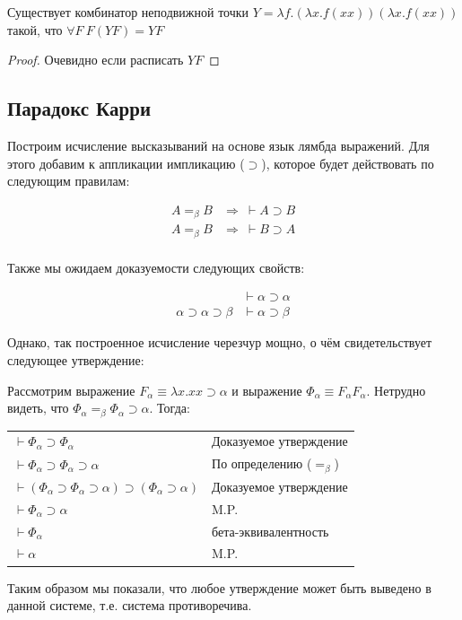 \begin{theorem}
Существует комбинатор неподвижной точки $Y = \lambda f . (\lambda x . f (x x))
(\lambda x . f (x x))$ такой, что $\forall F \  F (Y F) = Y F$
\end{theorem}
\begin{proof}
Очевидно если расписать $Y F$
\end{proof}


\subsection{Парадокс Карри}

Построим исчисление высказываний на основе язык лямбда выражений. Для этого
добавим к аппликации импликацию ($\supset$), которое будет действовать по
следующим правилам:

\begin{align*}
A =_\beta B &\Rightarrow \ \vdash A \supset B \\
A =_\beta B &\Rightarrow \ \vdash B \supset A \\
\end{align*}

Также мы ожидаем доказуемости следующих свойств:

\begin{align*}
&\vdash \alpha \supset \alpha \\
\alpha \supset \alpha \supset \beta &\vdash \alpha \supset \beta
\end{align*}

Однако, так построенное исчисление черезчур мощно, о чём свидетельствует
следующее утверждение:

Рассмотрим выражение $F_\alpha \equiv \lambda x. x x \supset \alpha$
и выражение $\Phi_\alpha \equiv F_\alpha F_\alpha$.
Нетрудно видеть, что $\Phi_\alpha =_\beta \Phi_\alpha \supset \alpha$.
Тогда: \\

\begin{tabular}{ll}
$\vdash \Phi_\alpha \supset \Phi_\alpha$ & Доказуемое утверждение\\
$\vdash \Phi_\alpha \supset \Phi_\alpha \supset \alpha$ & По определению ($=_\beta$)\\
$\vdash (\Phi_\alpha \supset \Phi_\alpha \supset \alpha) \supset (\Phi_\alpha \supset \alpha)$ & Доказуемое утверждение\\
$\vdash \Phi_\alpha \supset \alpha$ & M.P.\\
$\vdash \Phi_\alpha$ & бета-эквивалентность\\
$\vdash \alpha$ & M.P.
\end{tabular}

Таким образом мы показали, что любое утверждение может быть выведено в данной
системе, т.е. система противоречива.